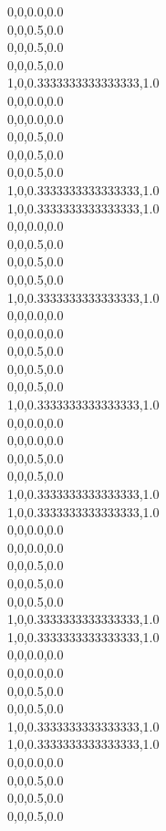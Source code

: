 0,0,0.0,0.0\\
0,0,0.5,0.0\\
0,0,0.5,0.0\\
0,0,0.5,0.0\\
1,0,0.3333333333333333,1.0\\
0,0,0.0,0.0\\
0,0,0.0,0.0\\
0,0,0.5,0.0\\
0,0,0.5,0.0\\
0,0,0.5,0.0\\
1,0,0.3333333333333333,1.0\\
1,0,0.3333333333333333,1.0\\
0,0,0.0,0.0\\
0,0,0.5,0.0\\
0,0,0.5,0.0\\
0,0,0.5,0.0\\
1,0,0.3333333333333333,1.0\\
0,0,0.0,0.0\\
0,0,0.0,0.0\\
0,0,0.5,0.0\\
0,0,0.5,0.0\\
0,0,0.5,0.0\\
1,0,0.3333333333333333,1.0\\
0,0,0.0,0.0\\
0,0,0.0,0.0\\
0,0,0.5,0.0\\
0,0,0.5,0.0\\
1,0,0.3333333333333333,1.0\\
1,0,0.3333333333333333,1.0\\
0,0,0.0,0.0\\
0,0,0.0,0.0\\
0,0,0.5,0.0\\
0,0,0.5,0.0\\
0,0,0.5,0.0\\
1,0,0.3333333333333333,1.0\\
1,0,0.3333333333333333,1.0\\
0,0,0.0,0.0\\
0,0,0.0,0.0\\
0,0,0.5,0.0\\
0,0,0.5,0.0\\
1,0,0.3333333333333333,1.0\\
1,0,0.3333333333333333,1.0\\
0,0,0.0,0.0\\
0,0,0.5,0.0\\
0,0,0.5,0.0\\
0,0,0.5,0.0\\
